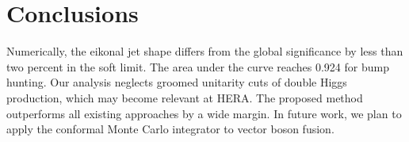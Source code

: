 \section{Conclusions}\label{sec:conclusions}

Numerically, the eikonal jet shape differs from the global significance
by less than two percent in the soft limit. The area under the curve
reaches 0.924 for bump hunting. Our analysis neglects groomed unitarity
cuts of double Higgs production, which may become relevant at HERA. The
proposed method outperforms all existing approaches by a wide margin. In
future work, we plan to apply the conformal Monte Carlo integrator to
vector boson fusion.

